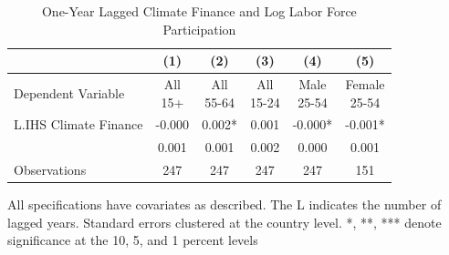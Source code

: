 \begin{table}[htbp]\centering
\def\sym#1{\ifmmode^{#1}\else\(^{#1}\)\fi}
\caption{One-Year Lagged Climate Finance and Log Labor Force Participation}
\begin{tabular}{l*{5}{c}}
\toprule
&\multicolumn{1}{c}{(1)}   &\multicolumn{1}{c}{(2)}   &\multicolumn{1}{c}{(3)}   &\multicolumn{1}{c}{(4)} & \multicolumn{1}{c}{(5)}   \\ \midrule Dependent Variable & \shortstack{All \\ 15+} & \shortstack{All \\ 55-64} & \shortstack{All \\ 15-24} & \shortstack{Male \\ 25-54} & \shortstack{Female \\ 25-54} \\ \midrule
L.IHS Climate Finance&      -0.000   &       0.002*  &       0.001   &      -0.000*  &      -0.001*  \\
            &       0.001   &       0.001   &       0.002   &       0.000   &       0.001   \\
\midrule
Observations&         247   &         247   &         247   &         247   &         151   \\
\bottomrule \end{tabular} \begin{center} \begin{minipage}{0.7\textwidth} \footnotesize\footnotesize \centering All specifications have covariates as described. The L indicates the number of lagged years.  Standard errors clustered at the country level. *, **, *** denote significance at the 10, 5, and 1 percent levels \end{minipage} \end{center} \end{table}
